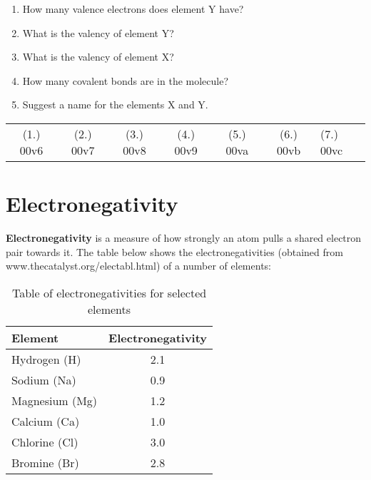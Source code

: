 {\begin{enumerate}
{\begin{enumerate}
\item{How many valence electrons does element Y have?}
\item{What is the valency of element Y?}
\item{What is the valency of element X?}
\item{How many covalent bonds are in the molecule?}
\item{Suggest a name for the elements X and Y.}
\end{enumerate}
}

\end{enumerate}
\practiceinfo

\begin{tabular}[h]{cccccc}
(1.) 00v6 & (2.) 00v7 & (3.) 00v8 & (4.) 00v9 & (5.) 00va & (6.) 00vb & (7.) 00vc & 
 \end{tabular}
}







\section{Electronegativity}

\textbf{Electronegativity} is a measure of how strongly an atom pulls a shared electron pair towards it. The table below shows the electronegativities (obtained from www.thecatalyst.org/electabl.html) of a number of elements:

\begin{table}[!h]
\begin{center}
\caption{Table of electronegativities for selected elements}
\begin{tabular}{|l|c|}\hline
\textbf{Element} & \textbf{Electronegativity}\\\hline
Hydrogen (H) & 2.1\\\hline
Sodium (Na) & 0.9\\\hline
Magnesium (Mg) & 1.2\\\hline
Calcium (Ca) & 1.0\\\hline
Chlorine (Cl) & 3.0\\\hline
Bromine (Br) & 2.8\\\hline
\end{tabular}
\end{center}
\end{table}

